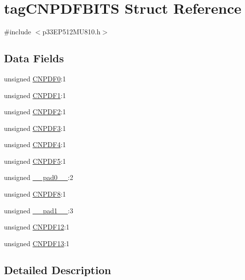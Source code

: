 \hypertarget{structtag_c_n_p_d_f_b_i_t_s}{}\section{tag\+C\+N\+P\+D\+F\+B\+I\+TS Struct Reference}
\label{structtag_c_n_p_d_f_b_i_t_s}


{\ttfamily \#include $<$p33\+E\+P512\+M\+U810.\+h$>$}

\subsection*{Data Fields}
\begin{DoxyCompactItemize}
\item 
unsigned \hyperlink{structtag_c_n_p_d_f_b_i_t_s_adaa7714093a31a55a25b123b544ecd5e}{C\+N\+P\+D\+F0}\+:1
\item 
unsigned \hyperlink{structtag_c_n_p_d_f_b_i_t_s_a3ca7379c80f78bbac542302ac2807f1d}{C\+N\+P\+D\+F1}\+:1
\item 
unsigned \hyperlink{structtag_c_n_p_d_f_b_i_t_s_a93bfe1c3c0effbb505d52a322374b745}{C\+N\+P\+D\+F2}\+:1
\item 
unsigned \hyperlink{structtag_c_n_p_d_f_b_i_t_s_a9f5d8e2734187115786877f7fdd0b956}{C\+N\+P\+D\+F3}\+:1
\item 
unsigned \hyperlink{structtag_c_n_p_d_f_b_i_t_s_a36c19bf7d923880668efabb858e7c20b}{C\+N\+P\+D\+F4}\+:1
\item 
unsigned \hyperlink{structtag_c_n_p_d_f_b_i_t_s_acba613e3f784ba7350a3e7e70b44e7a3}{C\+N\+P\+D\+F5}\+:1
\item 
unsigned \hyperlink{structtag_c_n_p_d_f_b_i_t_s_adf71f3d8410c1f1dbbc96680a92c49af}{\+\_\+\+\_\+pad0\+\_\+\+\_\+}\+:2
\item 
unsigned \hyperlink{structtag_c_n_p_d_f_b_i_t_s_a1a615d2a101d01f6720621e1968b5b4c}{C\+N\+P\+D\+F8}\+:1
\item 
unsigned \hyperlink{structtag_c_n_p_d_f_b_i_t_s_acaf2d0924a107ec6e8d2e31febaf66f9}{\+\_\+\+\_\+pad1\+\_\+\+\_\+}\+:3
\item 
unsigned \hyperlink{structtag_c_n_p_d_f_b_i_t_s_af4d6ff674a51b358777fa6a8053f9418}{C\+N\+P\+D\+F12}\+:1
\item 
unsigned \hyperlink{structtag_c_n_p_d_f_b_i_t_s_aa3e495ba54cea385c3797c46ed1a5bbe}{C\+N\+P\+D\+F13}\+:1
\end{DoxyCompactItemize}


\subsection{Detailed Description}



